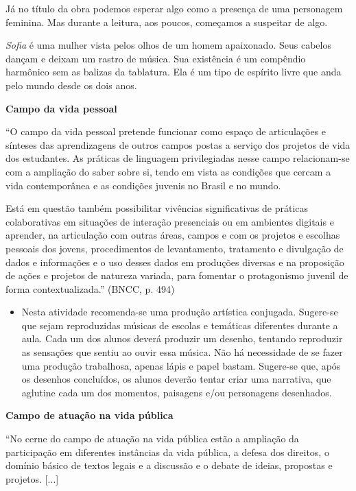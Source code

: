 \documentclass[12pt]{extarticle}
\begin{document}
Já no título da obra podemos esperar algo como a presença de uma personagem
feminina. Mas durante a leitura, aos poucos, começamos a suspeitar de algo.

\textit{Sofia} é uma mulher vista pelos olhos de um homem apaixonado. Seus cabelos
dançam e deixam um rastro de música. Sua existência é um compêndio harmônico
sem as balizas da tablatura. Ela é um tipo de espírito livre que anda pelo
mundo desde os dois anos.


\textbf{Campo da vida pessoal}

``O campo da vida pessoal pretende funcionar como espaço de articulações
e sínteses das aprendizagens de outros campos postas a serviço dos
projetos de vida dos estudantes. As práticas de linguagem privilegiadas
nesse campo relacionam-se com a ampliação do saber sobre si, tendo em
vista as condições que cercam a vida contemporânea e as condições
juvenis no Brasil e no mundo.

Está em questão também possibilitar vivências significativas de práticas
colaborativas em situações de interação presenciais ou em ambientes
digitais e aprender, na articulação com outras áreas, campos e com os
projetos e escolhas pessoais dos jovens, procedimentos de levantamento,
tratamento e divulgação de dados e informações e o uso desses dados em
produções diversas e na proposição de ações e projetos de natureza
variada, para fomentar o protagonismo juvenil de forma
contextualizada.'' (BNCC, p. 494)

\begin{itemize}
\item
  Nesta atividade recomenda-se uma produção artística conjugada.
  Sugere-se que sejam reproduzidas músicas de escolas e temáticas
  diferentes durante a aula. Cada um dos alunos deverá produzir um
  desenho, tentando reproduzir as sensações que sentiu ao ouvir essa
  música. Não há necessidade de se fazer uma produção trabalhosa, apenas
  lápis e papel bastam. Sugere-se que, após os desenhos concluídos, os
  alunos deverão tentar criar uma narrativa, que aglutine cada um dos
  momentos, paisagens e/ou personagens desenhados.
\end{itemize}

\textbf{Campo de atuação na vida pública}

``No cerne do campo de atuação na vida pública estão a ampliação da
participação em diferentes instâncias da vida pública, a defesa dos
direitos, o domínio básico de textos legais e a discussão e o debate de
ideias, propostas e projetos. {[}...{]}
\end{document}

